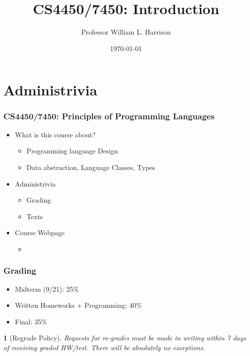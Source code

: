 \documentclass{beamer}
\title{CS4450/7450: Introduction}
\author{Professor William L. Harrison}
\date{\today}
\newtheorem{remark}{}
\begin{document}
\section{Administrivia}

\frame{\titlepage}


\frame
{
    \frametitle{CS4450/7450: Principles of Programming Languages}
    
\begin{itemize}
\item What is this course about?
\begin{itemize}
\item Programming language Design
\pause
\item Data abstraction, Language Classes, Types
\end{itemize}
\pause

\item Administrivia
\begin{itemize}
\item Grading
\item Texts
\end{itemize}
\pause

\item Course Webpage
\begin{itemize}
\item 
\end{itemize}

\end{itemize}
}

\frame
{
    \frametitle{Grading}
    
\begin{itemize}
\item Midterm (9/21): 25\%

\item Written Homeworks + Programming: 40\%

\item Final: 35\%

\end{itemize}

\begin{remark}[Regrade Policy]
Requests for re-grades must be made in writing within 7 days of 
receiving graded HW/test. There will be absolutely no exceptions.
\end{remark}
}
\end{document}
